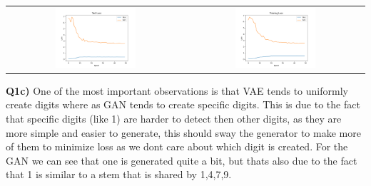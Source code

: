 \documentclass{article}
\begin{document}
\begin{titlepage}
\begin{center}
\begin{tabular}{cc}
\includegraphics[width=0.47\textwidth]{gantest.png} & \includegraphics[width=0.47\textwidth]{ganloss.png}
\end{tabular}
\end{center}
\newpage
\textbf{Q1c)} One of the most important observations is that VAE tends to uniformly create digits where as GAN tends to create specific digits. This is due to the fact that specific digits (like 1) are harder to detect then other digits, as they are more simple and easier to generate, this should sway the generator to make more of them to minimize loss as we dont care about which digit is created. For the GAN we can see that one is generated quite a bit, but thats also due to the fact that 1 is similar to a stem that is shared by 1,4,7,9.
\end{titlepage}
\end{document}
